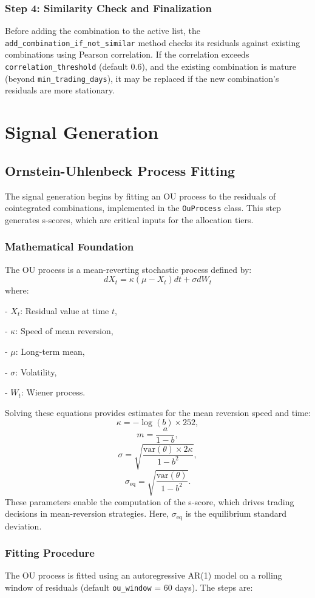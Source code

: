 \documentclass[a4paper,12pt]{article}
\begin{document}
\subsubsection{Step 4: Similarity Check and Finalization}
Before adding the combination to the active list, the \texttt{add\_combination\_if\_not\_similar} method checks its residuals against existing combinations using Pearson correlation. If the correlation exceeds \texttt{correlation\_threshold} (default 0.6), and the existing combination is mature (beyond \texttt{min\_trading\_days}), it may be replaced if the new combination’s residuals are more stationary.
\section{Signal Generation}
\subsection{Ornstein-Uhlenbeck Process Fitting}
The signal generation begins by fitting an OU process to the residuals of cointegrated combinations, implemented in the \texttt{OuProcess} class. This step generates s-scores, which are critical inputs for the allocation tiers.

\subsubsection{Mathematical Foundation}
The OU process is a mean-reverting stochastic process defined by:
\[
dX_t = \kappa (\mu - X_t) dt + \sigma dW_t
\]
where:

- \(X_t\): Residual value at time \(t\),

- \(\kappa\): Speed of mean reversion,

- \(\mu\): Long-term mean,

- \(\sigma\): Volatility,

- \(W_t\): Wiener process.

Solving these equations provides estimates for the mean reversion speed and time:
\[
\kappa = -\log(b) \times 252,
\]
\[
m = \frac{a}{1 - b},
\]
\[
\sigma = \sqrt{\frac{\text{var}(\theta) \times 2\kappa}{1 - b^2}},
\]
\[
\sigma_{\text{eq}} = \sqrt{\frac{\text{var}(\theta)}{1 - b^2}}.
\]
These parameters enable the computation of the s-score, which drives trading decisions in mean-reversion strategies.
Here, \(\sigma_{\text{eq}}\) is the equilibrium standard deviation.

\subsubsection{Fitting Procedure}
The OU process is fitted using an autoregressive AR(1) model on a rolling window of residuals (default \texttt{ou\_window} = 60 days). The steps are:
\end{document}
